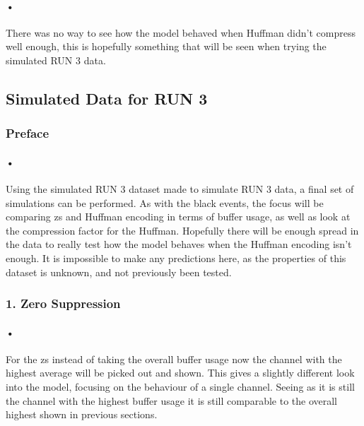 \documentclass[a4paper, 12pt, openright, twoside]{report}
\begin{document}
\paragraph{•}
There was no way to see how the model behaved when Huffman didn't compress well enough, this is hopefully something that will be seen when trying the simulated RUN 3 data.


\subsection{Simulated Data for RUN 3}

\subsubsection{Preface}
\paragraph{•}
Using the simulated RUN 3 dataset made to simulate RUN 3 data, a final set of simulations can be performed.
As with the black events, the focus will be comparing \gls{zs} and Huffman encoding in terms of buffer usage, as well as look at the compression factor for the Huffman.
Hopefully there will be enough spread in the data to really test how the model behaves when the Huffman encoding isn't enough.
It is impossible to make any predictions here, as the properties of this dataset is unknown, and not previously been tested.

\subsubsection{1. Zero Suppression}

\paragraph{•}
For the \gls{zs} instead of taking the overall buffer usage now the channel with the highest average will be picked out and shown.
This gives a slightly different look into the model, focusing on the behaviour of a single channel.
Seeing as it is still the channel with the highest buffer usage it is still comparable to the overall highest shown in previous sections. 
\end{document}
